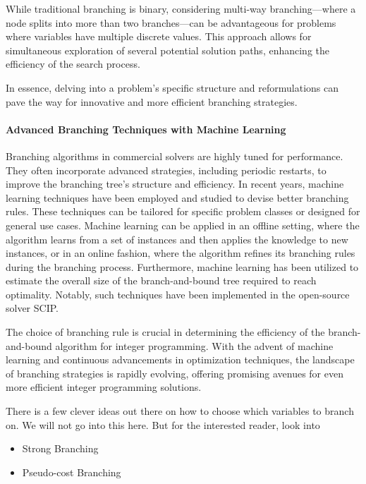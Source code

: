 While traditional branching is binary, considering multi-way branching—where a node splits into more than two branches—can be advantageous for problems where variables have multiple discrete values. This approach allows for simultaneous exploration of several potential solution paths, enhancing the efficiency of the search process.

In essence, delving into a problem's specific structure and reformulations can pave the way for innovative and more efficient branching strategies.

\paragraph{Advanced Branching Techniques with Machine Learning}

Branching algorithms in commercial solvers are highly tuned for performance. They often incorporate advanced strategies, including periodic restarts, to improve the branching tree's structure and efficiency. In recent years, machine learning techniques have been employed and studied to devise better branching rules. These techniques can be tailored for specific problem classes or designed for general use cases. Machine learning can be applied in an offline setting, where the algorithm learns from a set of instances and then applies the knowledge to new instances, or in an online fashion, where the algorithm refines its branching rules during the branching process. Furthermore, machine learning has been utilized to estimate the overall size of the branch-and-bound tree required to reach optimality. Notably, such techniques have been implemented in the open-source solver SCIP.

The choice of branching rule is crucial in determining the efficiency of the branch-and-bound algorithm for integer programming. With the advent of machine learning and continuous advancements in optimization techniques, the landscape of branching strategies is rapidly evolving, offering promising avenues for even more efficient integer programming solutions.

There is a few clever ideas out there on how to choose which variables to branch on.  We will not go into this here.  But for the interested reader, look into 
\begin{itemize}
\item Strong Branching
\item Pseudo-cost Branching
\end{itemize}


